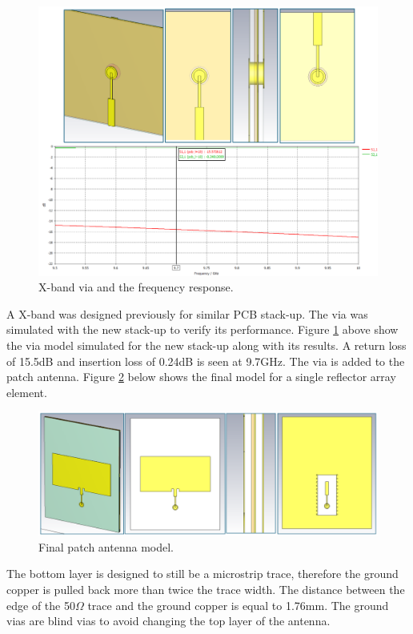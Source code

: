     \begin{figure}[H]
    \centering
    \includegraphics[width=0.85\linewidth]{Figures/chp3_CST_via_combined.png}
    \caption{X-band via and the frequency response.}
    \label{fig:chp3_CST_via_combined}
    \end{figure}

A X-band was designed previously for similar PCB stack-up. The via was simulated with the new stack-up to verify its performance. Figure \ref{fig:chp3_CST_via_combined} above show the via model simulated for the new stack-up along with its results. A return loss of 15.5dB and insertion loss of 0.24dB is seen at 9.7GHz. The via is added to the patch antenna. Figure \ref{fig:chp3_CPW_patch_via} below shows the final model for a single reflector array element. 

    \begin{figure}[H]
    \centering
    \includegraphics[width=0.6\linewidth]{Figures/chp3_CPW_patch_via.png}
    \caption{Final patch antenna model.}
    \label{fig:chp3_CPW_patch_via}
    \end{figure}

The bottom layer is designed to still be a microstrip trace, therefore the ground copper is pulled back more than twice the trace width. The distance between the edge of the 50$\Omega$ trace and the ground copper is equal to 1.76mm. The ground vias are blind vias to avoid changing the top layer of the antenna.

